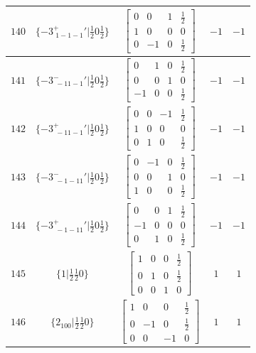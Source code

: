 \documentclass[fleqn,8pt]{jsarticle}
\begin{document}
\begin{longtable}{ccccc}
$ 140 $ & $ \{-3^{+}_{\,\,1-1-1}{}'|\frac{1}{2} 0 \frac{1}{2}\} $ & $ \begin{bmatrix} 0 & 0 & 1 & \frac{1}{2} \\ 1 & 0 & 0 & 0 \\ 0 & -1 & 0 & \frac{1}{2} \end{bmatrix} $ & $ -1 $ & $ -1 $ \\ \hline
$ 141 $ & $ \{-3^{-}_{\,\,-11-1}{}'|\frac{1}{2} 0 \frac{1}{2}\} $ & $ \begin{bmatrix} 0 & 1 & 0 & \frac{1}{2} \\ 0 & 0 & 1 & 0 \\ -1 & 0 & 0 & \frac{1}{2} \end{bmatrix} $ & $ -1 $ & $ -1 $ \\ \hline
$ 142 $ & $ \{-3^{+}_{\,\,-11-1}{}'|\frac{1}{2} 0 \frac{1}{2}\} $ & $ \begin{bmatrix} 0 & 0 & -1 & \frac{1}{2} \\ 1 & 0 & 0 & 0 \\ 0 & 1 & 0 & \frac{1}{2} \end{bmatrix} $ & $ -1 $ & $ -1 $ \\ \hline
$ 143 $ & $ \{-3^{-}_{\,\,-1-11}{}'|\frac{1}{2} 0 \frac{1}{2}\} $ & $ \begin{bmatrix} 0 & -1 & 0 & \frac{1}{2} \\ 0 & 0 & 1 & 0 \\ 1 & 0 & 0 & \frac{1}{2} \end{bmatrix} $ & $ -1 $ & $ -1 $ \\ \hline
$ 144 $ & $ \{-3^{+}_{\,\,-1-11}{}'|\frac{1}{2} 0 \frac{1}{2}\} $ & $ \begin{bmatrix} 0 & 0 & 1 & \frac{1}{2} \\ -1 & 0 & 0 & 0 \\ 0 & 1 & 0 & \frac{1}{2} \end{bmatrix} $ & $ -1 $ & $ -1 $ \\ \hline
$ 145 $ & $ \{1|\frac{1}{2} \frac{1}{2} 0\} $ & $ \begin{bmatrix} 1 & 0 & 0 & \frac{1}{2} \\ 0 & 1 & 0 & \frac{1}{2} \\ 0 & 0 & 1 & 0 \end{bmatrix} $ & $ 1 $ & $ 1 $ \\ \hline
$ 146 $ & $ \{2{}_{100}|\frac{1}{2} \frac{1}{2} 0\} $ & $ \begin{bmatrix} 1 & 0 & 0 & \frac{1}{2} \\ 0 & -1 & 0 & \frac{1}{2} \\ 0 & 0 & -1 & 0 \end{bmatrix} $ & $ 1 $ & $ 1 $ \\ \hline

\end{longtable}
\end{document}
